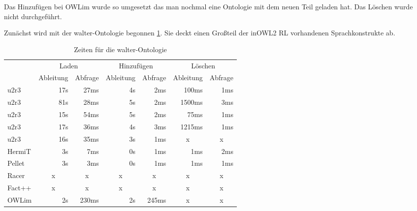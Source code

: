 Das Hinzufügen bei OWLim wurde so umgesetzt das man nochmal eine Ontologie mit dem neuen Teil geladen hat. Das Löschen wurde nicht durchgeführt.

Zunächst wird mit der walter-Ontologie begonnen \ref{table-time-walter}. Sie deckt einen Großteil der inOWL2 RL vorhandenen Sprachkonstrukte ab.

\begin{table}[htbp]
\caption{Zeiten für die walter-Ontologie}
\label{table-time-walter}
\begin{center}
\begin{threeparttable}
\begin{tabular}{l|r|r|r|r|r|r|}
\cline{2-7}
 & \multicolumn{2}{|c|}{Laden} & \multicolumn{2}{|c|}{Hinzufügen} & \multicolumn{2}{|c|}{Löschen} \\
\cline{2-7}
 & \multicolumn{1}{|c|}{Ableitung} & \multicolumn{1}{|c|}{Abfrage} & \multicolumn{1}{|c|}{Ableitung} & \multicolumn{1}{|c|}{Abfrage} & \multicolumn{1}{|c|}{Ableitung} & \multicolumn{1}{|c|}{Abfrage} \\
\hline
\multicolumn{1}{|l|}{u2r3\tnote{a}} & 17s & 27ms & 4s & 2ms & 100ms & 1ms \\ \hline
\multicolumn{1}{|l|}{u2r3\tnote{b}} & 81s & 28ms & 5s & 2ms & 1500ms & 3ms \\ \hline
\multicolumn{1}{|l|}{u2r3\tnote{c}} & 15s & 54ms & 5s & 2ms & 75ms & 1ms \\ \hline
\multicolumn{1}{|l|}{u2r3\tnote{d}} & 17s & 36ms & 4s & 3ms & 1215ms & 1ms \\ \hline
\multicolumn{1}{|l|}{u2r3\tnote{e}} & 16s & 35ms & 3s & 1ms & \multicolumn{1}{c|}{x} & \multicolumn{1}{c|}{x} \\ \hline
\multicolumn{1}{|l|}{HermiT} & 3s & 7ms & 0s & 1ms & 1ms & 2ms \\ \hline
\multicolumn{1}{|l|}{Pellet\tnote{f}} & 3s & 3ms & 0s & 1ms & 1ms & 1ms \\ \hline
\multicolumn{1}{|l|}{Racer\tnote{g}} & \multicolumn{1}{c|}{x} & \multicolumn{1}{c|}{x} & \multicolumn{1}{c|}{x} & \multicolumn{1}{c|}{x} & \multicolumn{1}{c|}{x} & \multicolumn{1}{c|}{x} \\ \hline
\multicolumn{1}{|l|}{Fact++\tnote{h}} & \multicolumn{1}{c|}{x} & \multicolumn{1}{c|}{x} & \multicolumn{1}{c|}{x} & \multicolumn{1}{c|}{x} & \multicolumn{1}{c|}{x} & \multicolumn{1}{c|}{x} \\ \hline
\multicolumn{1}{|l|}{OWLim} & 2s & 230ms & 2s & 245ms & \multicolumn{1}{c|}{x} & \multicolumn{1}{c|}{x} \\ \hline

\end{tabular}
\end{threeparttable}
\end{center}
\end{table}
